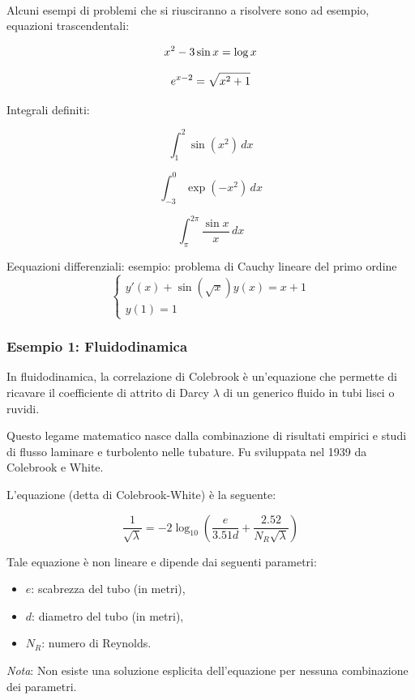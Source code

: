 \documentclass[a4paper, 11pt]{article}
\begin{document}
        \paragraph{}
        Alcuni esempi di problemi che si riusciranno a risolvere sono ad esempio, equazioni trascendentali:

        \begin{equation}
            x^2-3 \sin{x} = \log{x} \notag
        \end{equation}

        \begin{equation}
            e^{x-2} = \sqrt{x^2 + 1} \notag
        \end{equation}

        Integrali definiti: 
        
        \[
            \int_{1}^{2} \sin(x^2) \, dx
        \]   
        
        \[
        \int_{-3}^{0} \exp(-x^2) \, dx
        \]
        
        \[
        \int_{\pi}^{2\pi} \frac{\sin x}{x} \, dx
        \]

        Eequazioni differenziali:  esempio: problema di Cauchy lineare del primo ordine
        \[
            \begin{cases}
            y'(x) + \sin(\sqrt{x}) y(x) = x + 1 \\
            y(1) = 1
            \end{cases}
        \]


        \subsubsection*{Esempio 1: Fluidodinamica}
        In fluidodinamica, la correlazione di Colebrook è un'equazione che permette di ricavare il coefficiente di attrito di Darcy $\lambda$ di un generico fluido in tubi lisci o ruvidi.
        
        Questo legame matematico nasce dalla combinazione di risultati empirici e studi di flusso laminare e turbolento nelle tubature. Fu sviluppata nel 1939 da Colebrook e White.
        
        L'equazione (detta di Colebrook-White) è la seguente:

        \[
        \frac{1}{\sqrt{\lambda}} = -2 \log_{10} \left( \frac{e}{3.51d} + \frac{2.52}{N_R \sqrt{\lambda}} \right)
        \]

        
        Tale equazione è non lineare e dipende dai seguenti parametri:
            \begin{itemize}
                \item $e$: scabrezza del tubo (in metri),
                \item $d$: diametro del tubo (in metri),
                \item $N_R$: numero di Reynolds.
            \end{itemize}
        \textit{Nota}: Non esiste una soluzione esplicita dell'equazione per nessuna combinazione dei parametri.
\end{document}
